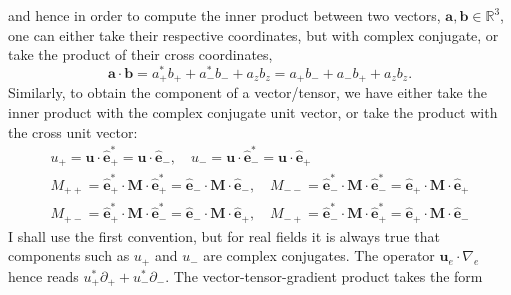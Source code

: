 %
and hence in order to compute the inner product between two vectors, $\mathbf{a}, \mathbf{b} \in \mathbb{R}^3$, one can either take their respective coordinates, but with complex conjugate, or take the product of their cross coordinates,
%
\[
    \mathbf{a}\cdot \mathbf{b} = a_+^* b_+ + a_-^* b_- + a_z b_z = a_+ b_- + a_- b_+ + a_z b_z.
\]
%
Similarly, to obtain the component of a vector/tensor, we have either take the inner product with the complex conjugate unit vector, or take the product with the cross unit vector:
%
\[
\begin{gathered}
    u_+ = \mathbf{u} \cdot \hat{\mathbf{e}}_+^* = \mathbf{u} \cdot \hat{\mathbf{e}}_-, \quad 
    u_- = \mathbf{u} \cdot \hat{\mathbf{e}}_-^* = \mathbf{u} \cdot \hat{\mathbf{e}}_+ \\ 
    M_{++} = \hat{\mathbf{e}}_+^* \cdot \mathbf{M} \cdot \hat{\mathbf{e}}_+^* = \hat{\mathbf{e}}_- \cdot \mathbf{M} \cdot \hat{\mathbf{e}}_-,\quad 
    M_{--} = \hat{\mathbf{e}}_-^* \cdot \mathbf{M} \cdot \hat{\mathbf{e}}_-^* = \hat{\mathbf{e}}_+ \cdot \mathbf{M} \cdot \hat{\mathbf{e}}_+ \\ 
    M_{+-} = \hat{\mathbf{e}}_+^* \cdot \mathbf{M} \cdot \hat{\mathbf{e}}_-^* = \hat{\mathbf{e}}_- \cdot \mathbf{M} \cdot \hat{\mathbf{e}}_+,\quad 
    M_{-+} = \hat{\mathbf{e}}_-^* \cdot \mathbf{M} \cdot \hat{\mathbf{e}}_+^* = \hat{\mathbf{e}}_+ \cdot \mathbf{M} \cdot \hat{\mathbf{e}}_-
\end{gathered}
\]
%
I shall use the first convention, but for real fields it is always true that components such as $u_+$ and $u_-$ are complex conjugates. The operator $\mathbf{u}_e\cdot \nabla_e$ hence reads $u_+^* \partial_+ + u_-^* \partial_-$. The vector-tensor-gradient product takes the form
